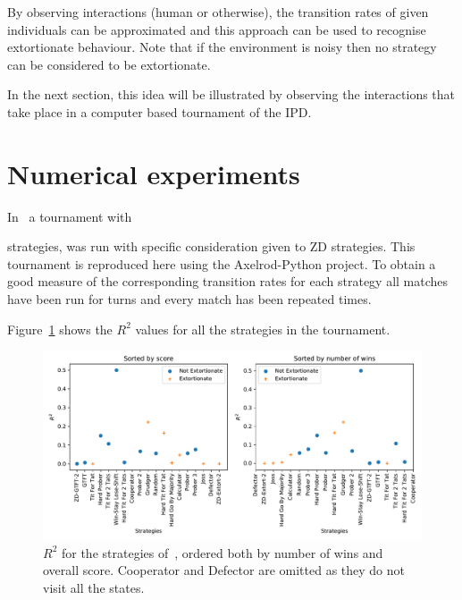 \documentclass[a4paper]{article}
\begin{document}
By observing interactions (human or otherwise), the transition rates of given
individuals can be approximated and this approach can be used to recognise
extortionate behaviour. Note that if the environment is noisy then no strategy
can be considered to be extortionate. %


In the next section, this idea will be illustrated by observing the interactions
that take place in a computer based tournament of the IPD\@.

\section{Numerical experiments}\label{sec:numerical-experiments}

In~\cite{Stewart2012} a tournament with

strategies, was run with specific consideration given to ZD strategies. This
tournament is reproduced here using the Axelrod-Python project. To obtain a good
measure of the corresponding transition rates for each strategy all matches have
been run for 
turns and every match has been
repeated 
times.

Figure~\ref{fig:R_squared_in_stewart_plotkin} shows the \(R^2\) values for all
the strategies in the tournament.

\begin{figure}[!htbp]
    \centering
    \includegraphics[width=.8\textwidth]{./assets/img/R_squared_in_stewart_plotkin/main.pdf}
    \caption{\(R^2\) for the strategies of~\cite{Stewart2012}, ordered both by
    number of wins and overall score. Cooperator and Defector are omitted as
    they do not visit all the states.}
    \label{fig:R_squared_in_stewart_plotkin}
\end{figure}
\end{document}
